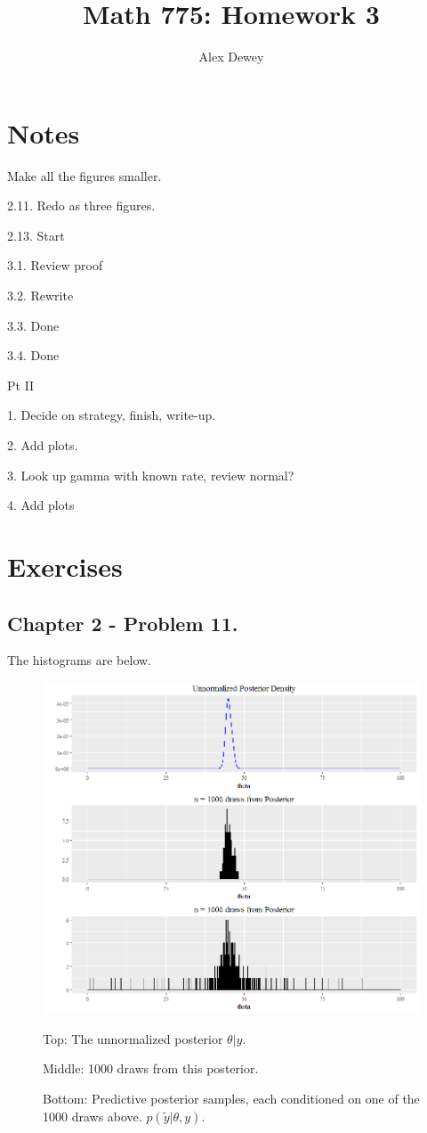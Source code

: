 \documentclass{article}
\begin{document}
\title{Math 775: Homework 3}
\author{Alex Dewey}


\maketitle


\section{Notes}

Make all the figures smaller.

2.11. Redo as three figures.

2.13. Start

3.1. Review proof

3.2. Rewrite

3.3. Done

3.4. Done

Pt II

1. Decide on strategy, finish, write-up.

2. Add plots.

3. Look up gamma with known rate, review normal?

4. Add plots

\section{Exercises}

\subsection{Chapter 2 - Problem 11.}

The histograms are below.

\begin{figure}[!ht]
  \centering
   \includegraphics[width=\textwidth]{Problem211-1}
   \caption{Top: The unnormalized posterior \(\theta \vert y\).}
  \caption{Middle: 1000 draws from this posterior.}
  \caption{Bottom: Predictive posterior samples, each conditioned on one of the 1000 draws above.
  \(p(\tilde{y} \vert \theta, y)\).}
\end{figure}
\end{document}
